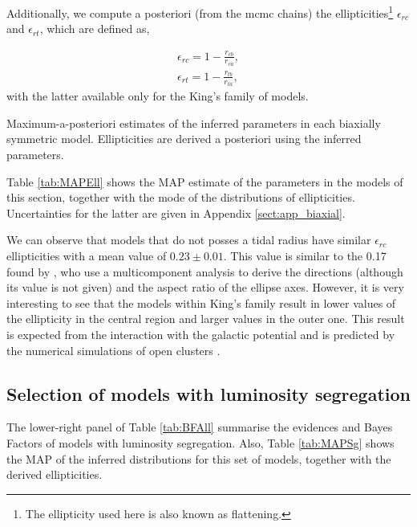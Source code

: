 Additionally, we compute a posteriori (from the \gls{mcmc} chains) the ellipticities\footnote{The ellipticity used here is also known as flattening.}  $\epsilon_{rc}$ and $\epsilon_{rt}$, which are defined as,

\begin{align}
\epsilon_{rc} = 1- \frac{r_{cb}}{r_{ca}}, \nonumber \\
\epsilon_{rt} = 1- \frac{r_{tb}}{r_{ta}}, \nonumber
\end{align}
with the latter available only for the King's family of models. 

 \begin{table}[ht!]
  \centering
      \caption[]{Maximum-a-posteriori estimates of the inferred parameters in each biaxially symmetric model. Ellipticities are derived a posteriori using the inferred parameters.}
         \label{tab:MAPEll}
          \resizebox{\textwidth}{!}{
         
         }
   \end{table}
   
Table \ref{tab:MAPEll} shows the MAP estimate of the parameters in the models of this section, together with the mode of the distributions of ellipticities. Uncertainties for the latter are given in Appendix \ref{sect:app_biaxial}.

We can observe that models that do not posses a tidal radius have similar $\epsilon_{rc}$ ellipticities with a mean value of $0.23\pm0.01$. This value is similar to the 0.17  found by \citep{Raboud1998}, who use a multicomponent analysis to derive the directions (although its value is not given) and the aspect ratio of the ellipse axes. However, it is very interesting to see that the models within King's family result in lower values of the ellipticity in the central region and larger values in the outer one. This result is expected from the interaction with the galactic potential and is predicted by the numerical simulations of open clusters \cite[see for example][]{1987MNRAS.224..193T}.
\subsection{Selection of models with luminosity segregation}
The lower-right panel of Table \ref{tab:BFAll} summarise the evidences and Bayes
Factors of models with luminosity segregation. Also, Table \ref{tab:MAPSg} shows the MAP of the inferred distributions for this set of models, together with the derived ellipticities.

